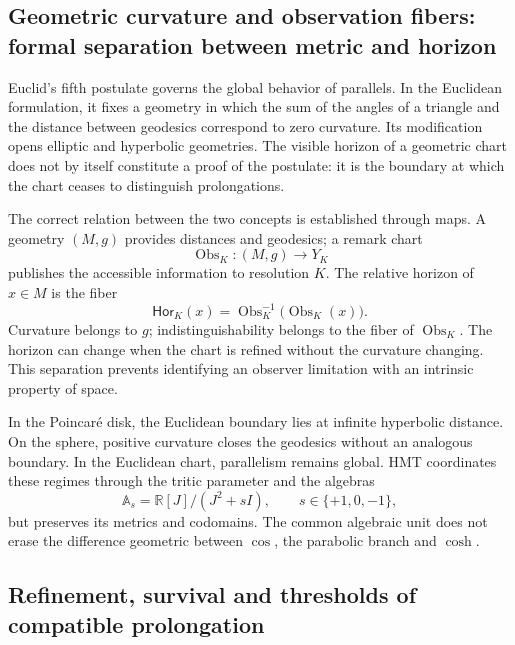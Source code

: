 \subsection{Geometric curvature and observation fibers: formal separation between metric and horizon}

Euclid's fifth postulate governs the global behavior of
parallels. In the Euclidean formulation, it fixes a geometry in which the sum of
the angles of a triangle and the distance between geodesics correspond to zero
curvature. Its modification opens elliptic and hyperbolic geometries.
The visible horizon of a geometric chart does not by itself constitute a
proof of the postulate: it is the boundary at which the chart ceases to distinguish
prolongations.

The correct relation between the two concepts is established through maps. A
geometry \((M,g)\) provides distances and geodesics; a remark
chart
\begin{equation}\label{p12-83-c0-s2:eq:amp-carta-horizonte}
 \operatorname{Obs}_{K}:(M,g)\longrightarrow Y_K
\end{equation}
publishes the accessible information to resolution \(K\). The relative horizon
of \(x\in M\) is the fiber
\begin{equation}\label{p12-83-c0-s2:eq:amp-fibra-horizonte}
 \mathsf{Hor}_K(x)=\operatorname{Obs}_K^{-1}
 \bigl(\operatorname{Obs}_K(x)\bigr).
\end{equation}
Curvature belongs to \(g\); indistinguishability belongs to the fiber
of \(\operatorname{Obs}_K\). The horizon can change when the chart is refined
without the curvature changing. This separation prevents identifying an
observer limitation with an intrinsic property of space.

In the Poincaré disk, the Euclidean boundary lies at infinite hyperbolic
distance. On the sphere, positive curvature closes the geodesics without an
analogous boundary. In the Euclidean chart, parallelism remains global. HMT
coordinates these regimes through the tritic parameter and the algebras
\begin{equation}\label{p12-83-c0-s2:eq:amp-tres-regimenes}
 \mathbb A_s=\mathbb R[J]/(J^2+sI),
 \qquad s\in\{+1,0,-1\},
\end{equation}
but preserves its metrics and codomains. The common algebraic unit does not erase
the difference geometric between \(\cos\), the parabolic branch and \(\cosh\).

\subsection{Refinement, survival and thresholds of compatible prolongation}


